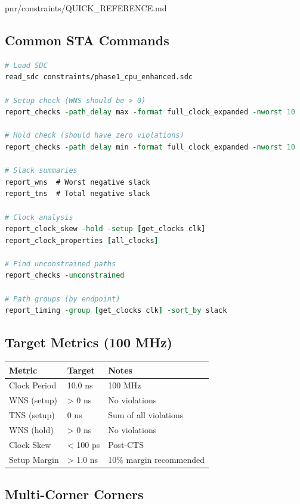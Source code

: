 \begin{relocated}{pnr/constraints/QUICK_REFERENCE.md}
\subsection{Common STA Commands}\label{tm:pd:constraints-quick-reference:common-sta-commands}

\begin{lstlisting}[language=tcl]
# Load SDC
read_sdc constraints/phase1_cpu_enhanced.sdc

# Setup check (WNS should be > 0)
report_checks -path_delay max -format full_clock_expanded -nworst 10

# Hold check (should have zero violations)
report_checks -path_delay min -format full_clock_expanded -nworst 10

# Slack summaries
report_wns  # Worst negative slack
report_tns  # Total negative slack

# Clock analysis
report_clock_skew -hold -setup [get_clocks clk]
report_clock_properties [all_clocks]

# Find unconstrained paths
report_checks -unconstrained

# Path groups (by endpoint)
report_timing -group [get_clocks clk] -sort_by slack
\end{lstlisting}

\subsection{Target Metrics (100 MHz)}\label{tm:pd:constraints-quick-reference:target-metrics-100-mhz}

{
\begin{longtable}[]{@{}lll@{}}
\toprule\noalign{}
Metric & Target & Notes \\
\midrule\noalign{}
\endhead
\bottomrule\noalign{}
\endlastfoot
Clock Period & 10.0 ns & 100 MHz \\
WNS (setup) & \textgreater{} 0 ns & No violations \\
TNS (setup) & 0 ns & Sum of all violations \\
WNS (hold) & \textgreater{} 0 ns & No violations \\
Clock Skew & \textless{} 100 ps & Post-CTS \\
Setup Margin & \textgreater{} 1.0 ns & 10\% margin recommended \\
\end{longtable}
}

\subsection{Multi-Corner Corners}\label{tm:pd:constraints-quick-reference:multi-corner-corners}


\end{relocated}
